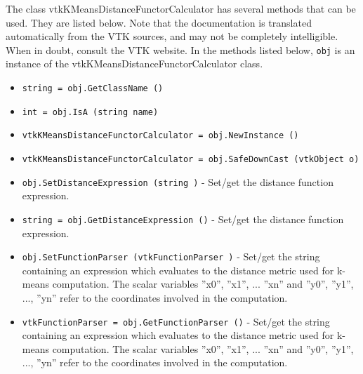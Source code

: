 The class vtkKMeansDistanceFunctorCalculator has several methods that can be used.
  They are listed below.
Note that the documentation is translated automatically from the VTK sources,
and may not be completely intelligible.  When in doubt, consult the VTK website.
In the methods listed below, \verb|obj| is an instance of the vtkKMeansDistanceFunctorCalculator class.
\begin{itemize}
\item  \verb|string = obj.GetClassName ()|

\item  \verb|int = obj.IsA (string name)|

\item  \verb|vtkKMeansDistanceFunctorCalculator = obj.NewInstance ()|

\item  \verb|vtkKMeansDistanceFunctorCalculator = obj.SafeDownCast (vtkObject o)|

\item  \verb|obj.SetDistanceExpression (string )| -  Set/get the distance function expression.

\item  \verb|string = obj.GetDistanceExpression ()| -  Set/get the distance function expression.

\item  \verb|obj.SetFunctionParser (vtkFunctionParser )| -  Set/get the string containing an expression which evaluates to the
 distance metric used for k-means computation. The scalar variables
 ''x0'', ''x1'', ... ''xn'' and ''y0'', ''y1'', ..., ''yn'' refer to the coordinates
 involved in the computation.

\item  \verb|vtkFunctionParser = obj.GetFunctionParser ()| -  Set/get the string containing an expression which evaluates to the
 distance metric used for k-means computation. The scalar variables
 ''x0'', ''x1'', ... ''xn'' and ''y0'', ''y1'', ..., ''yn'' refer to the coordinates
 involved in the computation.

\end{itemize}
